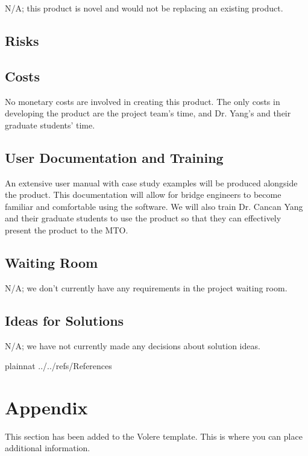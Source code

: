 \documentclass[12pt]{article}
\begin{document}
N/A; this product is novel and would not be replacing an existing product.

\subsection{Risks}



\subsection{Costs}

No monetary costs are involved in creating this product. The only costs in developing the product are the project team's time, and Dr. Yang's and their graduate students' time.

\subsection{User Documentation and Training}

An extensive user manual with case study examples will be produced alongside the product. This documentation will allow for bridge engineers to become familiar and comfortable using the software.
We will also train Dr. Cancan Yang and their graduate students to use the product so that they can effectively present the product to the MTO.

\subsection{Waiting Room}

N/A; we don't currently have any requirements in the project waiting room.

\subsection{Ideas for Solutions}

N/A; we have not currently made any decisions about solution ideas.

\newpage

 {plainnat}
 {../../refs/References}

\newpage

\section{Appendix}

This section has been added to the Volere template.  This is where you can place
additional information.
\end{document}
